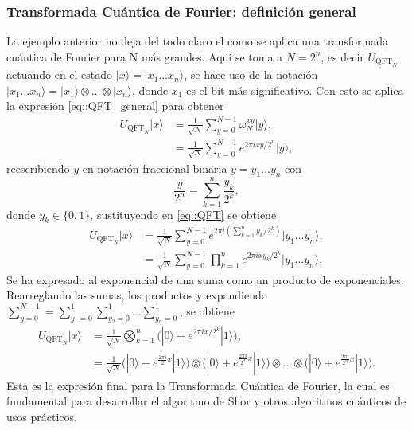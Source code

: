 \documentclass[a4paper]{article}
\begin{document}
\subsubsection{Transformada Cuántica de Fourier: definición general}
La ejemplo anterior no deja del todo claro el como se aplica una transformada cuántica de Fourier para N más grandes. Aquí se toma a $N=2^n$, es decir $U_{\text{QFT}_N}$ actuando en el estado $|x\rangle=|x_1\hdots x_n\rangle$, se hace uso de la notación $|x_1\hdots x_n\rangle=|x_1\rangle\otimes\hdots\otimes |x_n\rangle$, donde $x_1$ es el bit más significativo. Con esto se aplica la expresión \ref{eq::QFT_general} para obtener
\begin{equation}\label{eq::QFT}
\begin{aligned}
U_{\text{QFT}_N}|x\rangle &=\frac{1}{\sqrt{N}}\sum_{y=0}^{N-1}\omega_N^{xy}|y\rangle,\\
&=\frac{1}{\sqrt{N}}\sum_{y=0}^{N-1} e^{2\pi i xy/2^{n}}|y\rangle,
\end{aligned}
\end{equation}
reescribiendo $y$ en notación fraccional binaria $y=y_1\hdots y_n$ con
\begin{equation*}
\frac{y}{2^n}=\sum_{k=1}^{n}\frac{y_k}{2^k},
\end{equation*}
donde $y_k \in\{ 0, 1 \}$, sustituyendo en \ref{eq::QFT} se obtiene
\begin{equation}\label{eq::QFT_2}
\begin{aligned}
U_{\text{QFT}_N}|x\rangle &=\frac{1}{\sqrt{N}}\sum_{y=0}^{N-1}e^{2\pi i(\sum_{k=1}^n y_k/2^k)}|y_1 \hdots y_n\rangle,\\
&=\frac{1}{\sqrt{N}}\sum_{y=0}^{N-1} \prod_{k=1}^n e^{2\pi i x y_k/2^{k}}|y_1 \hdots y_n\rangle.
\end{aligned}
\end{equation}
Se ha expresado al exponencial de una suma como un producto de exponenciales. Rearreglando las sumas, los productos y expandiendo $\sum_{y=0}^{N-1}=\sum_{y_1=0}^1 \sum_{y_2=0}^1 \hdots \sum_{y_n=0}^1$, se obtiene
\begin{equation}\label{eq::QFT_3}
\begin{aligned}
U_{\text{QFT}_N}|x\rangle &=\frac{1}{\sqrt{N}} \bigotimes_{k=1}^n \bigg(|0\rangle + e^{2\pi i x/2^k}|1\rangle \bigg),  \\
&=\frac{1}{\sqrt{N}}\bigg(|0\rangle + e^{\frac{2\pi i}{2} x} |1\rangle \bigg)\otimes\bigg(|0\rangle + e^{\frac{2\pi i}{2^2} x} |1\rangle \bigg)\otimes \hdots \otimes \bigg(|0\rangle + e^{\frac{2\pi i}{2^{n}} x} |1\rangle \bigg).
\end{aligned}
\end{equation}
Esta es la expresión final para la Transformada Cuántica de Fourier, la cual es fundamental para desarrollar el algoritmo de Shor \cite{Shor} y otros algoritmos cuánticos de usos prácticos.
\end{document}
